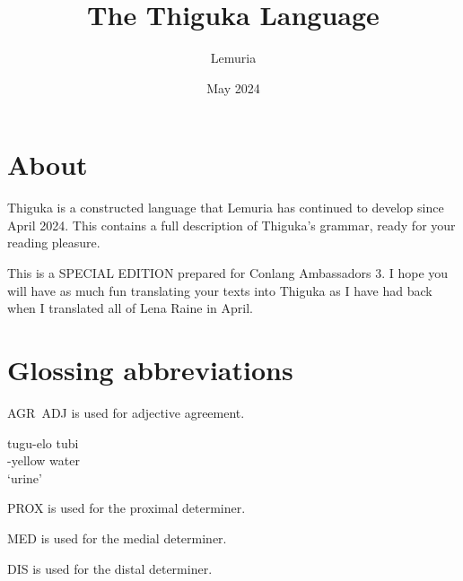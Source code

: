\documentclass{thiguka}
\title{The Thiguka Language}
\date{May 2024}
\author{Lemuria}
\begin{document}
\maketitle

\newpage

\thigukacopyright{}

\section*{About}
Thiguka is a constructed language that Lemuria has continued to develop since April 2024.
This contains a full description of Thiguka's grammar, ready for your reading pleasure.

This is a SPECIAL EDITION prepared for Conlang Ambassadors 3. I hope you will have as much fun translating your texts into Thiguka as I have had back when I translated all of Lena Raine in April.

\section*{Glossing abbreviations}

AGR~ADJ is used for adjective agreement.
\begin{exe}
    \ex{} \gll{}tu\textapprox{}gu-elo tubi\\
    \agradj{}-yellow water\\
    \glt{}`urine'
\end{exe}

PROX is used for the proximal determiner.

MED is used for the medial determiner.

DIS is used for the distal determiner.

\newpage

\tableofcontents







\end{document}
